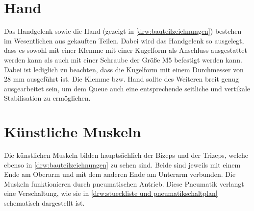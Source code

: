 	\section{Hand}
		Das Handgelenk sowie die Hand (gezeigt in \cref{drw:bauteilzeichnungen}) bestehen im Wesentlichen aus gekauften Teilen.
		Dabei wird das Handgelenk so ausgelegt, dass es sowohl mit einer Klemme mit einer Kugelform als Anschluss ausgestattet werden kann als auch mit einer Schraube der Größe M5 befestigt werden kann.
		Dabei ist lediglich zu beachten, dass die Kugelform mit einem Durchmesser von 28 mm ausgeführt ist.
		Die Klemme bzw. Hand sollte des Weiteren breit genug ausgearbeitet sein, um dem Queue auch eine entsprechende seitliche und vertikale Stabilisation zu ermöglichen.
	
	\section{Künstliche Muskeln}
		Die künstlichen Muskeln bilden hauptsächlich der Bizeps und der Trizeps, welche ebenso in \cref{drw:bauteilzeichnungen} zu sehen sind.
		Beide sind jeweils mit einem Ende am Oberarm und mit dem anderen Ende am Unterarm verbunden.
		Die Muskeln funktionieren durch pneumatischen Antrieb.
		Diese Pneumatik verlangt eine Verschaltung, wie sie in \cref{drw:stueckliste und pneumatikschaltplan} schematisch dargestellt ist.